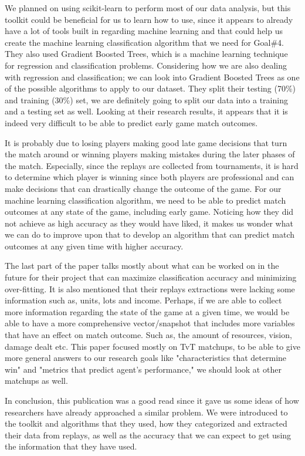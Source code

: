 \documentclass[a4paper,12pt]{report}
\begin{document}
We planned on using scikit-learn to perform most of our data analysis, but this toolkit could be beneficial for us to learn how to use, since it appears to already have a lot of tools built in regarding machine learning and that could help us create the machine learning classification algorithm that we need for Goal\#4. They also used Gradient Boosted Trees, which is a machine learning technique for regression and classification problems. Considering how we are also dealing with regression and classification; we can look into Gradient Boosted Trees as one of the possible algorithms to apply to our dataset. They split their testing (70\%) and training (30\%) set, we are definitely going to split our data into a training and a testing set as well. Looking at their research results, it appears that it is indeed very difficult to be able to predict early game match outcomes.

It is probably due to losing players making good late game decisions that turn the match around or winning players making mistakes during the later phases of the match. Especially, since the replays are collected from tournaments, it is hard to determine which player is winning since both players are professional and can make decisions that can drastically change the outcome of the game. For our machine learning classification algorithm, we need to be able to predict match outcomes at any state of the game, including early game. Noticing how they did not achieve as high accuracy as they would have liked, it makes us wonder what we can do to improve upon that to develop an algorithm that can predict match outcomes at any given time with higher accuracy.

The last part of the paper talks mostly about what can be worked on in the future for their project that can maximize classification accuracy and minimizing over-fitting. It is also mentioned that their replays extractions were lacking some information such as, units, lots and income.
Perhaps, if we are able to collect more information regarding the state of the game at a given time, we would be able to have a more comprehensive vector/snapshot that includes more variables that have an effect on match outcome. Such as, the amount of resources, vision, damage dealt etc. This paper focused mostly on TvT matchups, to be able to give more general answers to our research goals like "characteristics that determine win" and "metrics that predict agent’s performance," we should look at other matchups as well.

In conclusion, this publication was a good read since it gave us some ideas of how researchers have already approached a similar problem. We were introduced to the toolkit and algorithms that they used, how they categorized and extracted their data from replays, as well as the accuracy that we can expect to get using the information that they have used.
\end{document}
